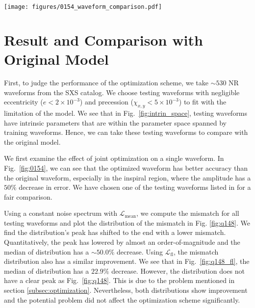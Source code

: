 \documentclass[twocolumn]{aastex631}
\begin{document}
\begin{figure*}[t]
	\centering
	\texttt{[image: figures/0154\_waveform\_comparison.pdf]}
	\caption{Comparison between original and optimized IMRPhenomD waveforms. Here shows the SXS:BBH:0154 NR waveform, which has mass ratio $q=1$ and $\chi_1=\chi_2=-0.8$. The original mismatch is around $2.8\times10^{-4}$ and the optimized mismatch is around $5.3\times10^{-5}$. Top: It shows the amplitude and phase of NR, original IMRPhenomD and optimized IMRPhenomD waveform. Bottom: It shows the relative error of amplitudes between NR and IMRPhenomD waveforms, and the absolute error of phases between NR and IMRPhenomD waveforms}
	\label{fig:0154}
\end{figure*}

\section{Result and Comparison with Original Model} \label{sec:result}

First, to judge the performance of the optimization scheme, we take $\sim530$ NR waveforms from the SXS catalog. We choose testing waveforms with negligible eccentricity (${e<2\times10^{-3}}$) and precession (${\chi_{x,y}<5\times10^{-3}}$) to fit with the limitation of the model. We see that in Fig.~\ref{fig:intrin_space}, testing waveforms have intrinsic parameters that are within the parameter space spanned by training waveforms. Hence, we can take these testing waveforms to compare with the original model. 

We first examine the effect of joint optimization on a single waveform. In Fig.~\ref{fig:0154}, we can see that the optimized waveform has better accuracy than the original waveform, especially in the inspiral region, where the amplitude has a $50\%$ decrease in error. We have chosen one of the testing waveforms listed in \cite{khan2016frequency} for a fair comparison. 

Using a constant noise spectrum with $\mathcal{L}_{\mathrm{mean}}$, we compute the mismatch for all testing waveforms and plot the distribution of the mismatch in Fig. \ref{fig:q148}. We find the distribution's peak has shifted to the end with a lower mismatch. Quantitatively, the peak has lowered by almost an order-of-magnitude and the median of distribution has a $\sim50.0\%$ decrease. Using $\mathcal{L}_{\mathrm{fl}}$, the mismatch distribution also has a similar improvement. We see that in Fig.~\ref{fig:q148_fl}, the median of distribution has a $22.9\%$ decrease. However, the distribution does not have a clear peak as Fig.~\ref{fig:q148}. This is due to the problem mentioned in section \ref{subsec:optimization}. Nevertheless, both distributions show improvement and the potential problem did not affect the optimization scheme significantly.  
\end{document}
